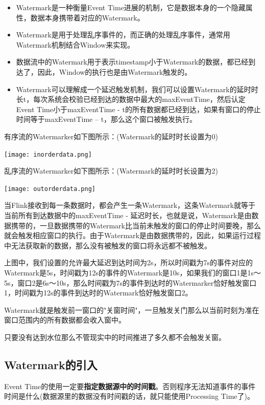 \documentclass[oneside]{ctexbook}
\begin{document}
\begin{itemize}
\item Watermark是一种衡量Event Time进展的机制，它是数据本身的一个隐藏属性，数据本身携带着对应的Watermark。
\item Watermark是用于处理乱序事件的，而正确的处理乱序事件，通常用Watermark机制结合Window来实现。
\item 数据流中的Watermark用于表示timestamp小于Watermark的数据，都已经到达了，因此，Window的执行也是由Watermark触发的。
\item Watermark可以理解成一个延迟触发机制，我们可以设置Watermark的延时时长t，每次系统会校验已经到达的数据中最大的maxEventTime，然后认定Event Time小于maxEventTime - t的所有数据都已经到达，如果有窗口的停止时间等于maxEventTime – t，那么这个窗口被触发执行。
\end{itemize}

有序流的Watermarker如下图所示：(Watermark的延时时长设置为0)

\noindent \texttt{[image: inorderdata.png]}

乱序流的Watermarker如下图所示：(Watermark的延时时长设置为2)

\noindent \texttt{[image: outorderdata.png]}

当Flink接收到每一条数据时，都会产生一条Watermark，这条Watermark就等于当前所有到达数据中的maxEventTime - 延迟时长，也就是说，Watermark是由数据携带的，一旦数据携带的Watermark比当前未触发的窗口的停止时间要晚，那么就会触发相应窗口的执行。由于Watermark是由数据携带的，因此，如果运行过程中无法获取新的数据，那么没有被触发的窗口将永远都不被触发。

上图中，我们设置的允许最大延迟到达时间为2s，所以时间戳为7s的事件对应的Watermark是5s，时间戳为12s的事件的Watermark是10s，如果我们的窗口1是1s～5s，窗口2是6s～10s，那么时间戳为7s的事件到达时的Watermarker恰好触发窗口1，时间戳为12s的事件到达时的Watermark恰好触发窗口2。
 
Watermark就是触发前一窗口的"关窗时间"，一旦触发关门那么以当前时刻为准在窗口范围内的所有数据都会收入窗中。

只要没有达到水位那么不管现实中的时间推进了多久都不会触发关窗。

\subsection{Watermark的引入}

Event Time的使用一定要\textbf{指定数据源中的时间戳}。否则程序无法知道事件的事件时间是什么(数据源里的数据没有时间戳的话，就只能使用Processing Time了)。
\end{document}
